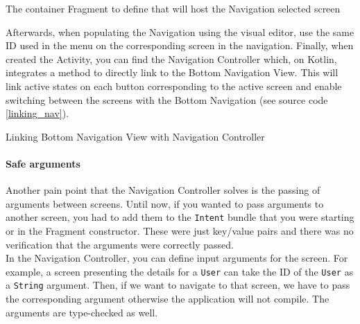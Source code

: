 \documentclass[11pt,a4paper]{report}
\newenvironment{code}{\captionsetup{type=listing}}{}
\begin{document}
\begin{code}
	\caption{The container Fragment to define that will host the Navigation selected screen}
	\label{Activity_nav_host}
\end{code}

Afterwards, when populating the Navigation using the visual editor, use the same ID used in the menu on the corresponding screen in the navigation. Finally, when created the Activity, you can find the Navigation Controller which, on Kotlin, integrates a method to directly link to the Bottom Navigation View. This will link active states on each button corresponding to the active screen and enable switching between the screens with the Bottom Navigation (see source code \ref{linking_nav}).

\begin{code}
	\caption{Linking Bottom Navigation View with Navigation Controller}
	\label{linking_nav}
\end{code}
\paragraph{Safe arguments}
Another pain point that the Navigation Controller solves is the passing of arguments between screens. Until now, if you wanted to pass arguments to another screen, you had to add them to the \verb+Intent+ bundle that you were starting or in the Fragment constructor. These were just key/value pairs and there was no verification that the arguments were correctly passed.\\

In the Navigation Controller, you can define input arguments for the screen. For example, a screen presenting the details for a \verb+User+ can take the ID of the \verb+User+ as a \verb+String+ argument. Then, if we want to navigate to that screen, we have to pass the corresponding argument otherwise the application will not compile. The arguments are type-checked as well. \\
\end{document}
